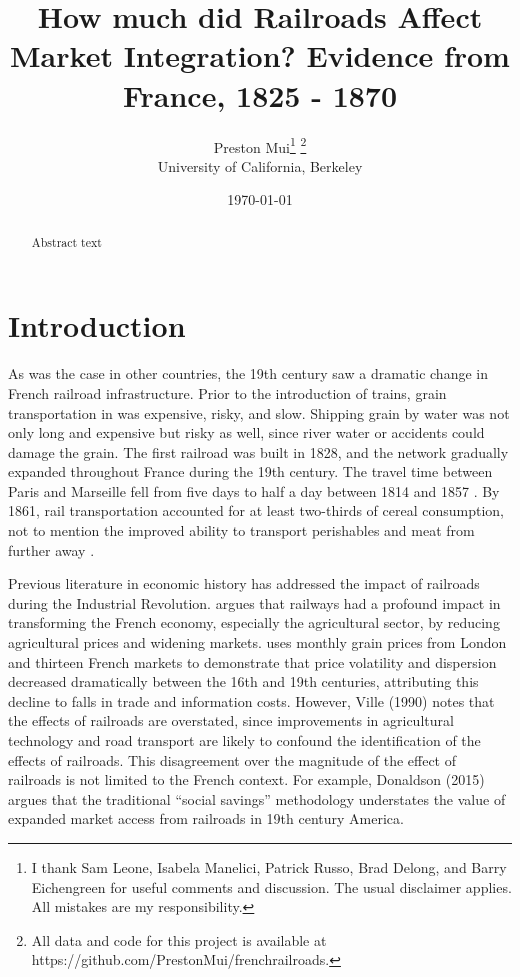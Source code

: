\documentclass[12pt,twoside]{article}
\title{How much did Railroads Affect Market Integration? Evidence from France, 1825 - 1870}
\date{\today}
\author{Preston Mui\footnote{I thank Sam Leone, Isabela Manelici, Patrick Russo, Brad Delong, and Barry Eichengreen for useful comments and discussion. The usual disclaimer applies. All mistakes are my responsibility.} \footnote{All data and code for this project is available at https://github.com/PrestonMui/frenchrailroads.}  \\ University of California, Berkeley}
\begin{document}
\maketitle

\begin{abstract}
   Abstract text
\end{abstract}

\newpage
\section{Introduction}

As was the case in other countries, the 19th century saw a dramatic change in French railroad infrastructure.
Prior to the introduction of trains, grain transportation in was expensive, risky, and slow.
Shipping grain by water was not only long and expensive but risky as well, since river water or accidents could damage the grain.
The first railroad was built in 1828, and the network gradually expanded throughout France during the 19th century.
The travel time between Paris and Marseille fell from five days to half a day between 1814 and 1857 \citep{thevenin}.
By 1861, rail transportation accounted for at least two-thirds of cereal consumption, not to mention the improved ability to transport perishables and meat from further away \citep{price}.

Previous literature in economic history has addressed the impact of railroads during the Industrial Revolution.
\cite{price} argues that railways had a profound impact in transforming the French economy, especially the agricultural sector, by reducing agricultural prices and widening markets.
\cite{persson} uses monthly grain prices from London and thirteen French markets to demonstrate that price volatility and dispersion decreased dramatically between the 16th and 19th centuries, attributing this decline to falls in trade and information costs.
However, Ville (1990) notes that the effects of railroads are overstated, since improvements in agricultural technology and road transport are likely to confound the identification of the effects of railroads.
This disagreement over the magnitude of the effect of railroads is not limited to the French context.
For example, Donaldson (2015) argues that the traditional ``social savings'' methodology understates the value of expanded market access from railroads in 19th century America.

\end{document}

